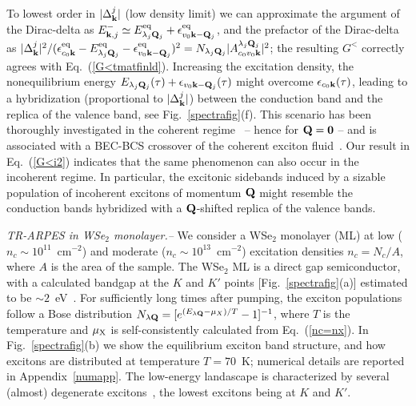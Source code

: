 \documentclass[twocolumn,aps,a4paper,superscriptaddress]{revtex4-2}
\begin{document}
To lowest order in $|\Delta^{j}_{{\mathbf k}}|$
(low density limit) we can approximate the argument of the
Dirac-delta as $E_{{\mathbf k},j}^{-}\simeq
E^{\rm eq}_{\lambda_{j}{\mathbf Q}_{j}}+\epsilon^{\rm eq}_{v_{0}{\mathbf k}-{\mathbf Q}_{j}}$,
and the prefactor of the Dirac-delta as
$|\Delta_{{\mathbf k}}^{j}|^{2}/(\epsilon^{\rm eq}_{c_{0}{\mathbf k}}-E^{\rm eq}_{\lambda_{j}{\mathbf Q}_{j}}
-\epsilon^{\rm eq}_{v_{0}{\mathbf k}-{\mathbf Q}_{j}})^{2}=N_{\lambda_{j}{\mathbf Q}_{j}}|A^{\lambda_{j}{\mathbf Q}_{j}}_{c_{0}v_{0}{\mathbf k}}|^{2}$;
the resulting $G^{<}$ correctly agrees with
Eq.~(\ref{G<tmatfinld}).
Increasing the excitation density, the nonequilibrium
energy $E_{\lambda_{j}{\mathbf Q}_{j}}(\tau)+\epsilon_{v_{0}{\mathbf k}-{\mathbf Q}_{j}}(\tau)$
might overcome $\epsilon_{c_{0}{\mathbf k}}(\tau)$, leading to a
hybridization (proportional to $|\Delta^{j}_{{\mathbf k}}|$) between the
conduction band and the replica of the valence band, see
Fig.~\ref{spectrafig}(f).
This scenario has been thoroughly investigated in the
coherent
regime~\cite{perfetto_pump-driven_2019,perfetto_time-resolved_2020,chan_giant_2023} -- hence for ${\mathbf Q}=\mathbf 0$ --
and is associated with a BEC-BCS crossover of the coherent exciton
fluid~\cite{ostreich_non-stationary_1993,hannewald_excitonic_2000}.
Our result in Eq.~(\ref{G<i2})
indicates that the same phenomenon can also occur in the
incoherent regime. In particular, the excitonic sidebands induced by
a sizable population of incoherent
excitons of momentum ${\mathbf Q}$ might resemble the conduction
bands hybridized with a ${\mathbf Q}$-shifted replica of the valence bands.



{\em TR-ARPES in WSe$_{2}$ monolayer.--} We consider a WSe$_{2}$
monolayer (ML) at low ($n_{c}\sim 10^{11}$~cm$^{-2}$) and moderate
($n_{c}\sim 10^{13}$~cm$^{-2}$) excitation densities $n_{c}=N_{c}/A$,
where $A$ is the area of the sample. The WSe$_{2}$ ML is a direct gap semiconductor,
with a
calculated bandgap at the $K$ and $K'$ points [Fig.~\ref{spectrafig}(a)]
estimated to be $\sim 2$~eV~\cite{lin_narrow-band_2021}.
For sufficiently long times after pumping, the exciton populations follow a
Bose distribution
$N_{\lambda{\mathbf Q}}=[e^{(E_{\lambda{\mathbf Q}}-\mu_{X})/T}-1]^{-1}$, where $T$ is the
temperature and $\mu_{\rm X}$ is self-consistently calculated from
Eq.~(\ref{nc=nx}).
In Fig.~\ref{spectrafig}(b) we show the equilibrium
exciton band structure, and how excitons are distributed
at temperature $T=70$~K; numerical details are reported in
Appendix~\ref{numapp}.
The low-energy landascape is characterized by several (almost) degenerate
excitons~\cite{deilmann_finite-momentum_2019,madeo_directly_2020},
the lowest excitons being at $K$ and $K'$.
\end{document}
